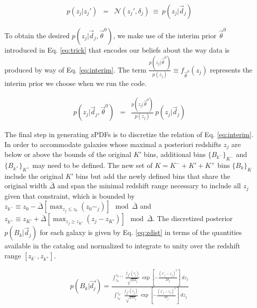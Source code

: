 \documentclass[preprint]{aastex}
\begin{document}
\begin{eqnarray}
\label{eq:zspread}
p(z_{j}|z_{j}') &=& \mathcal{N}(z_{j}',\delta_{j})\ \equiv\ p(z_{j}|\vec{d}_{j})
\end{eqnarray}

To obtain the desired $p(z_{j}|\vec{d}_{j},\vec{\theta}^{0})$, we make use of the interim prior $\vec{\theta}^{0}$ introduced in Eq. \ref{eq:trick} that encodes our beliefs about the way data is produced by way of Eq. \ref{eq:interim}.  The term $\frac{p(z_{j}|\vec{\theta}^{0})}{p(z_{j})}\equiv f_{\vec{\theta}^{0}}(z_{j})$ represents the interim prior we choose when we run the code.

\begin{eqnarray}
\label{eq:interim}
p(z_{j}|\vec{d}_{j},\vec{\theta}^{0}) &=& \frac{p(z_{j}|\vec{\theta}^{0})}{p(z_{j})}\ p(z_{j}|\vec{d}_{j})
\end{eqnarray}

The final step in generating zPDFs is to discretize the relation of Eq. \ref{eq:interim}.  In order to accommodate galaxies whose maximal a posteriori redshifts $z_{j}$ are below or above the bounds of the original $K'$ bins, additional bins $\{B_{k^{-}}\}_{K^{-}}$ and $\{B_{k^{+}}\}_{K^{+}}$ may need to be defined.  The new set of $K=K^{-}+K'+K^{+}$ bins $\{B_{k}\}_{K}$ include the original $K'$ bins but add the newly defined bins that share the original width $\bar{\Delta}$ and span the minimal redshift range necessary to include all $z_{j}$ given that constraint, which is bounded by $z_{k^{-}}\equiv z_{0}-\bar{\Delta}[\max_{z_{j}\leq z_{0}}(z_{0}-_{j})]\mod\bar{\Delta}$ and $z_{k^{+}}\equiv z_{K'}+\bar{\Delta}[\max_{z_{j}\geq z_{K'}}(z_{j}-z_{K'})]\mod\bar{\Delta}$.  The discretized posterior $p(B_{k}|\vec{d}_{j})$ for each galaxy is given by Eq. \ref{eq:zdist} in terms of the quantities available in the catalog and normalized to integrate to unity over the redshift range $[z_{k^{-}},z_{k^{+}}]$.  

\begin{eqnarray}
\label{eq:zdist}
p(B_{k}|\vec{d_{j}}) = \frac{\int_{z_{k}}^{z_{k+1}}\ \frac{f_{\vec{\theta}^{0}}(z_{j})}{\sqrt{2\pi\delta_{j}}}\ \exp\left[-\frac{(z'_{j}-z_{j})^{2}}{2\delta_{j}}\right]\ dz_{j}}{\int_{z_{k^{-}}}^{z_{k^{+}}}\ \frac{f_{\vec{\theta}^{0}}(z_{j})}{\sqrt{2\pi\delta_{j}}}\ \exp\left[-\frac{(z'_{j}-z_{j})^{2}}{2\delta_{j}}\right]\ dz_{j}}
\end{eqnarray}
\end{document}
